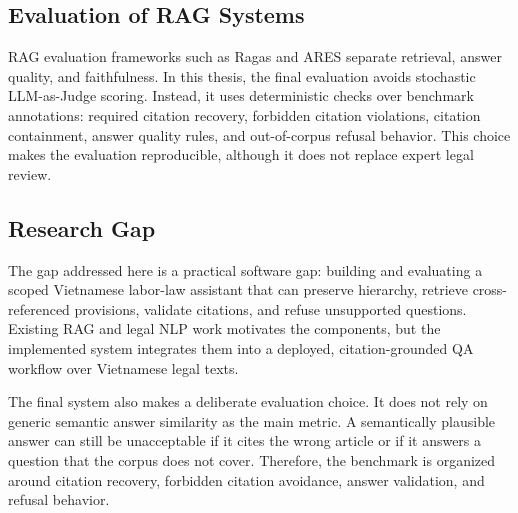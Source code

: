 \subsection{Evaluation of RAG Systems}
RAG evaluation frameworks such as Ragas \cite{es2023ragas} and ARES \cite{saadfalcon2023ares} separate retrieval, answer quality, and faithfulness. In this thesis, the final evaluation avoids stochastic LLM-as-Judge scoring. Instead, it uses deterministic checks over benchmark annotations: required citation recovery, forbidden citation violations, citation containment, answer quality rules, and out-of-corpus refusal behavior. This choice makes the evaluation reproducible, although it does not replace expert legal review.

\subsection{Research Gap}
The gap addressed here is a practical software gap: building and evaluating a scoped Vietnamese labor-law assistant that can preserve hierarchy, retrieve cross-referenced provisions, validate citations, and refuse unsupported questions. Existing RAG and legal NLP work motivates the components, but the implemented system integrates them into a deployed, citation-grounded QA workflow over Vietnamese legal texts.

The final system also makes a deliberate evaluation choice. It does not rely on generic semantic answer similarity as the main metric. A semantically plausible answer can still be unacceptable if it cites the wrong article or if it answers a question that the corpus does not cover. Therefore, the benchmark is organized around citation recovery, forbidden citation avoidance, answer validation, and refusal behavior.
